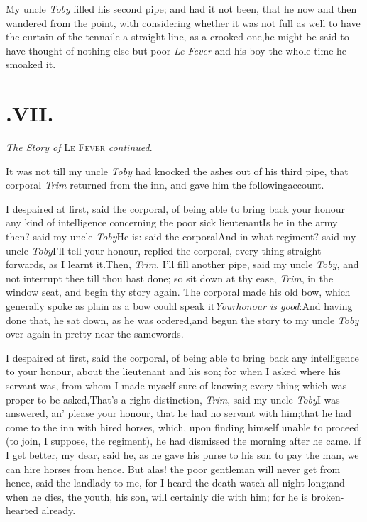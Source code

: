\documentclass{article}
\begin{document}
My uncle \textit{Toby} filled his second pipe; and had it not
been, that he now and then wandered from the point, with
considering whether it was not full as well to have the curtain of the tennaile a straight
line, as a crooked one,\tsk he might be said to have thought of
nothing else but poor \textit{Le Fever} and his boy the whole time he
smoaked it.

\vfill{}\eject\null
\section{.\enspace VII.}

\medskip
\centerline{\textit{The Story of} \textsc{Le Fever} \textit{continued}.}

\dropcap It was not till my uncle \textit{Toby} had knocked the
ashes out of his third pipe, that corporal \textit{Trim}
returned from the inn, and gave him the following\break account.

I despaired at first, said the corporal, of being able to bring
back your honour any kind of intelligence concerning the poor
sick lieutenant\tsk Is he in the army then? said my uncle
\textit{Toby}\tsh He is: said the corporal\tsh And in what
re\-giment? said my uncle \textit{Toby}\tsh I’ll tell your honour,
replied the corporal, every thing straight forwards, as I learnt
it.\tsk\break Then, \textit{Trim}, I’ll fill another pipe, said my
uncle \textit{Toby}, and not interrupt thee
till thou hast done; so sit down at thy ease, \textit{Trim}, in
the window seat, and begin thy story again. The corporal made
his old bow, which generally spoke as plain as a bow could speak
it\tsk \textit{Your\break honour is good}:\tsk And having done that,
he sat down, as he was ordered,\tsk\break and begun the story to my
uncle \textit{Toby} over again in pretty near the same\break words.

I despaired at first, said the corporal, of being able to bring
back any intelligence to your honour, about the lieutenant and his
son; for when I asked where his servant was, from whom I made
myself sure of knowing every thing which was proper to be
asked,\tsk\break That’s a right distinction, \textit{Trim}, said my
uncle \textit{Toby}\tsk I was answered, an’ please your
honour, that he had no servant 
with him;\tsh that he had come to the\break
inn with hired horses, which, upon\break
finding himself unable to proceed (to\break
join, I suppose, the regiment), he had\break
dismissed the morning after he came.\tsk\break
If I get better, my dear, said he, as he\break
gave his purse to his son to pay the man,\break
\tsk we can hire horses from hence.\tsh\break
But alas! the poor gentleman will never\break
get from hence, said the landlady to me,\break
\tsk for I heard the death-watch all night\break
long;\tsh and when he dies, the youth,\break
his son, will certainly die with him;\break
for he is broken-hearted already.
\end{document}

